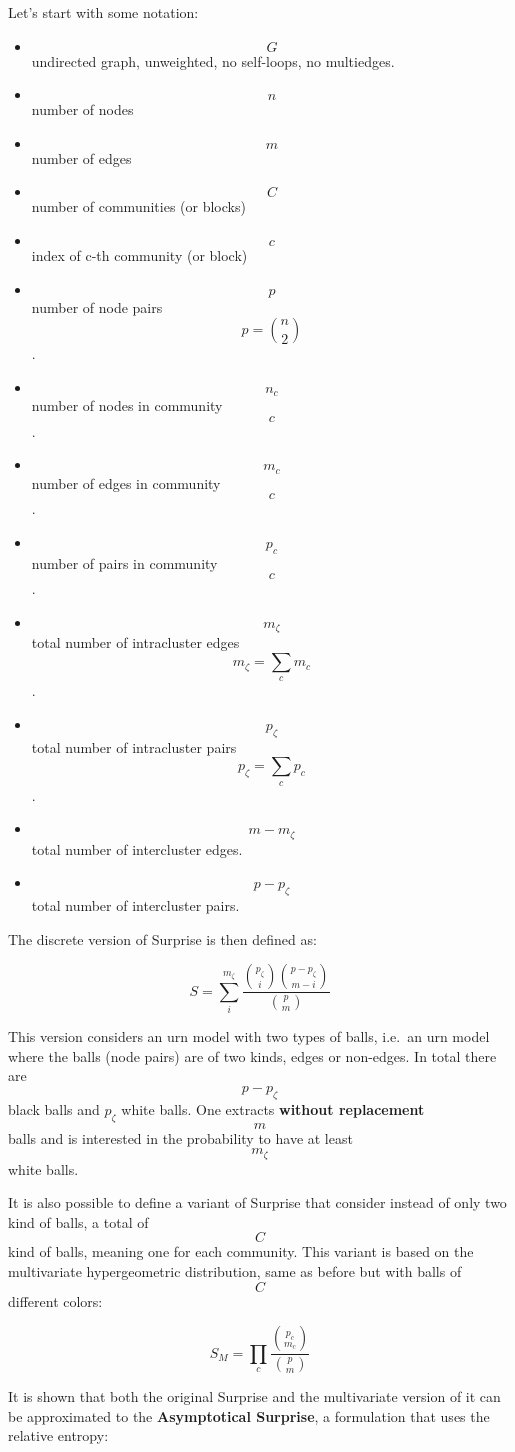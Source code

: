 Let's start with some notation:

\begin{itemize}[<+->]
\tightlist
\item
  \[G\] undirected graph, unweighted, no self-loops, no multiedges.
\item
  \[n\] number of nodes
\item
  \[m\] number of edges
\item
  \[C\] number of communities (or blocks)
\item
  \[c\] index of c-th community (or block)
\item
  \[p\] number of node pairs \[p=\binom{n}{2}\].
\item
  \[n_c\] number of nodes in community \[c\].
\item
  \[m_c\] number of edges in community \[c\].
\item
  \[p_c\] number of pairs in community \[c\].
\item
  \[m_\zeta\] total number of intracluster edges \[m_\zeta=\sum_c m_c\].
\item
  \[p_\zeta\] total number of intracluster pairs \[p_\zeta=\sum_c p_c\].
\item
  \[m-m_\zeta\] total number of intercluster edges.
\item
  \[p-p_\zeta\] total number of intercluster pairs.
\end{itemize}

The discrete version of Surprise is then defined as:

\[ S = \sum \limits_i ^{m_\zeta} \dfrac{\binom{p_\zeta}{i}  \binom{p-p_\zeta}{m-i} }{\binom{p}{m}}\]

This version considers an urn model with two types of balls, i.e.~an urn
model where the balls (node pairs) are of two kinds, edges or non-edges.
In total there are \[p-p_\zeta\] black balls and \(p_\zeta\) white
balls. One extracts \textbf{without replacement} \[m\] balls and is
interested in the probability to have at least \[m_\zeta\] white balls.

It is also possible to define a variant of Surprise that consider
instead of only two kind of balls, a total of \[C\] kind of balls,
meaning one for each community. This variant is based on the
multivariate hypergeometric distribution, same as before but with balls
of \[C\] different colors:

\[S_M = \prod \limits_c \dfrac{\binom{p_c}{m_c}}{\binom{p}{m}}\]

It is shown that both the original Surprise and the multivariate version
of it can be approximated to the \textbf{Asymptotical Surprise}, a
formulation that uses the relative entropy:

